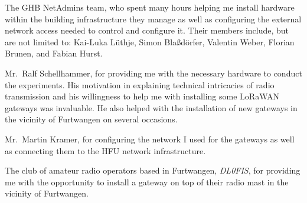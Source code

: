 The \ac{GHB} NetAdmins team, who spent many hours helping me install hardware within the building infrastructure they manage as well as configuring the external network access needed to control and configure it.
Their members include, but are not limited to: Kai-Luka Lüthje, Simon Blaßdörfer, Valentin Weber, Florian Brunen, and Fabian Hurst.

Mr.\ Ralf Schellhammer, for providing me with the necessary hardware to conduct the experiments.
His motivation in explaining technical intricacies of radio transmission and his willingness to help me with installing some \ac{LoRaWAN} gateways was invaluable.
He also helped with the installation of new gateways in the vicinity of Furtwangen on several occasions.

Mr.\ Martin Kramer, for configuring the network I used for the gateways as well as connecting them to the \ac{HFU} network infrastructure.

The club of amateur radio operators based in Furtwangen, \emph{DL0FIS}, for providing me with the opportunity to install a gateway on top of their radio mast in the vicinity of Furtwangen.